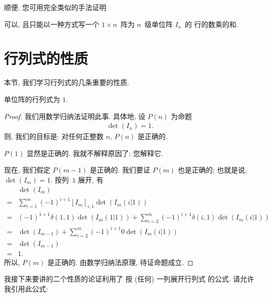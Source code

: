 顺便, 您可用完全类似的手法证明

\begin{theorem}
    可以, 且只能以一种方式写一个
    \(1 \times n\)~阵为 \(n\)~级单位阵 \(I_n\)~的%
    行的数乘的和.
\end{theorem}

\section{行列式的性质}

本节, 我们学习行列式的几条重要的性质.

\begin{theorem}[规范性]
    单位阵的行列式为 \(1\).
\end{theorem}

\begin{proof}
    我们用数学归纳法证明此事.
    具体地, 设 \(P(n)\) 为命题
    \begin{align*}
        \det {(I_n)} = 1.
    \end{align*}
    则, 我们的目标是:
    对任何正整数 \(n\), \(P(n)\) 是正确的.

    \(P(1)\) 显然是正确的.
    我就不解释原因了; 您解释它.

    现在, 我们假定 \(P(m-1)\) 是正确的.
    我们要证 \(P(m)\) 也是正确的;
    也就是说, \(\det {(I_m)} = 1\).
    按列~\(1\) 展开, 有
    \begin{align*}
             & \det {(I_m)}
        \\
        = {} & \sum_{i = 1}^{m}
        {(-1)^{i+1} [I_m]_{i,1} \det {(I_m (i|1))}}
        \\
        = {} & (-1)^{1+1} \delta(1, 1) \det {(I_m (1|1))}
        + \sum_{i = 2}^{m}
        {(-1)^{i+1} \delta(i, 1) \det {(I_m (i|1))}}
        \\
        = {} & \det {(I_{m-1})}
        + \sum_{i = 2}^{m}
        {(-1)^{i+1} 0 \det {(I_m (i|1))}}
        \\
        = {} & \det {(I_{m-1})}
        \\
        = {} & 1.
    \end{align*}
    所以, \(P(m)\) 是正确的.
    由数学归纳法原理, 待证命题成立.
\end{proof}

我接下来要讲的二个性质的论证利用了%
按 (任何) 一列展开行列式%
的公式.
请允许我引用此公式:

